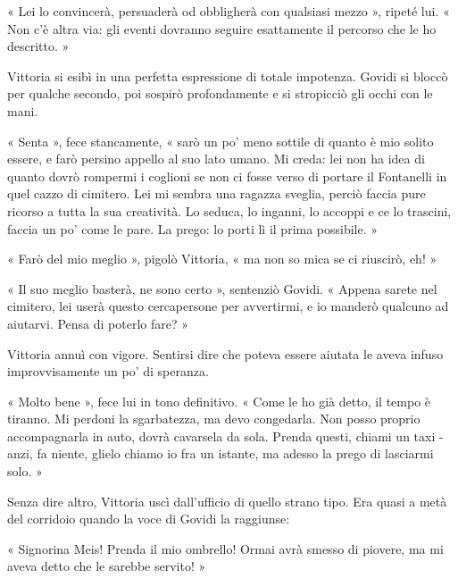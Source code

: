 « Lei lo convincerà, persuaderà od obbligherà con qualsiasi mezzo », ripeté lui. « Non c'è altra via: gli eventi dovranno seguire esattamente il percorso che le ho descritto. »

Vittoria si esibì in una perfetta espressione di totale impotenza. Govidi si bloccò per qualche secondo, poi sospirò profondamente e si stropicciò gli occhi con le mani.

« Senta », fece stancamente, « sarò un po' meno sottile di quanto è mio solito essere, e farò persino appello al suo lato umano. Mi creda: lei non ha idea di quanto dovrò rompermi i coglioni se non ci fosse verso di portare il Fontanelli in quel cazzo di cimitero. Lei mi sembra una ragazza sveglia, perciò faccia pure ricorso a tutta la sua creatività. Lo seduca, lo inganni, lo accoppi e ce lo trascini, faccia un po' come le pare. La prego: lo porti lì il prima possibile. »

« Farò del mio meglio », pigolò Vittoria, « ma non so mica se ci riuscirò, eh! »

« Il suo meglio basterà, ne sono certo », sentenziò Govidi. « Appena sarete nel cimitero, lei userà questo cercapersone per avvertirmi, e io manderò qualcuno ad aiutarvi. Pensa di poterlo fare? »

Vittoria annuì con vigore. Sentirsi dire che poteva essere aiutata le aveva infuso improvvisamente un po' di speranza.

« Molto bene », fece lui in tono definitivo. « Come le ho già detto, il tempo è tiranno. Mi perdoni la sgarbatezza, ma devo congedarla. Non posso proprio accompagnarla in auto, dovrà cavarsela da sola. Prenda questi, chiami un taxi - anzi, fa niente, glielo chiamo io fra un istante, ma adesso la prego di lasciarmi solo. »

Senza dire altro, Vittoria uscì dall'ufficio di quello strano tipo. Era quasi a metà del corridoio quando la voce di Govidi la raggiunse:

« Signorina Meis! Prenda il mio ombrello! Ormai avrà smesso di piovere, ma mi aveva detto che le sarebbe servito! »